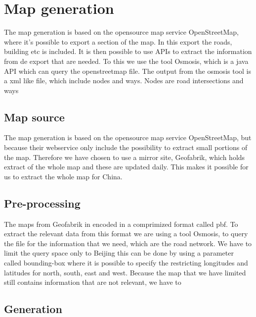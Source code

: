 \section{Map generation}
The map generation is based on the opensource map service OpenStreetMap, where it's possible to export a section of the map. In this export the roads, building etc is included. It is then possible to use APIs to extract the information from de export that are needed. To this we use the tool Osmosis, which is a java API which can query the openstreetmap file.
The output from the osmosis tool is a xml like file, which include nodes and ways. Nodes are road intersections and ways 

\subsection{Map source}
The map generation is based on the opensource map service OpenStreetMap, but because their webservice only include the possibility to extract small portions of the map.
Therefore we have chosen to use a mirror site, Geofabrik, which holds extract of the whole map and these are updated daily. This makes it possible for us to extract the whole map for China.

\subsection{Pre-processing}
The maps from Geofabrik in encoded in a comprimized format called pbf. To extract the relevant data from this format we are using a tool Osmosis, to query the file for the information that we need, which are the road network.
We have to limit the query space only to Beijing this can be done by using a parameter called bounding-box where it is possible to specify the restricting longitudes and latitudes for north, south, east and west.
Because the map that we have limited still contains information that are not relevant, we have to 

\subsection{Generation}